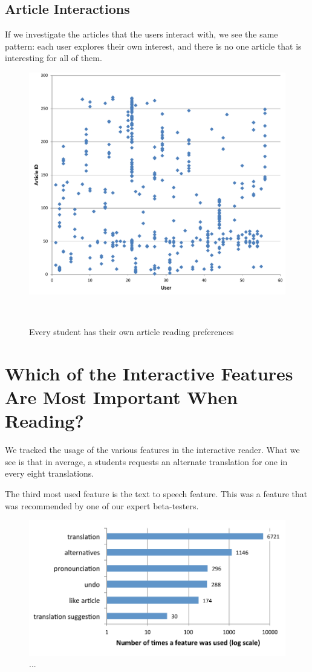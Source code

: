 \subsection{Article Interactions}
If we investigate the articles that the users interact with, we see the same pattern: each user explores their own interest, and there is no one article that is interesting for all of them. 

\begin{figure}[h!]
\centering
  \includegraphics[width=\columnwidth]{figures/users_articles}
  \caption{Every student has their own article reading preferences}~\label{fig:registrations}
\end{figure}

\newpage
\section{Which of the Interactive Features Are Most Important When Reading?}
We tracked the usage of the various features in the interactive reader. What we see is that in average, a students requests an alternate translation for one in every eight translations. 

The third most used feature is the text to speech feature. This was a feature that was recommended by one of our expert beta-testers. 


\begin{figure}[h!]
\centering
  \includegraphics[width=0.7\columnwidth]{figures/reader_feature_usage}
  \caption{... }
\end{figure}

